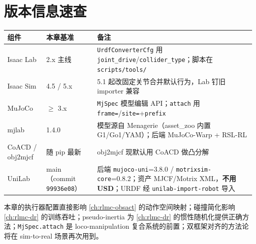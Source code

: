 \section*{版本信息速查}
\label{sec:rlmc-assets-versions}

\begin{center}
\small
\begin{tabular}{@{}lll@{}}
\toprule
组件 & 本章基准 & 备注 \\
\midrule
Isaac Lab & 2.x 主线 & \texttt{UrdfConverterCfg} 用 \texttt{joint\_drive}/\texttt{collider\_type}；脚本在 \texttt{scripts/tools/} \\
Isaac Sim & 4.5 / 5.x & 5.1 起改固定关节合并默认行为，Lab 钉旧 importer 兼容 \\
MuJoCo & $\ge$ 3.x & \texttt{MjSpec} 模型编辑 API；\texttt{attach} 用 \texttt{frame=}/\texttt{site=}+\texttt{prefix} \\
mjlab & 1.4.0 & 模型源自 Menagerie（asset\_zoo 内置 G1/Go1/YAM）；后端 MuJoCo-Warp + RSL-RL \\
CoACD / obj2mjcf & 随 pip 最新 & obj2mjcf 现默认用 CoACD 做凸分解 \\
UniLab & main（commit \texttt{99936e08}） & 后端 \texttt{mujoco-uni}=3.8.0 / \texttt{motrixsim-core}=0.8.2；资产 MJCF/Motrix XML，\textbf{不用 USD}；URDF 经 \texttt{unilab-import-robot} 导入 \\
\bottomrule
\end{tabular}
\end{center}

\begin{note}[本章与后续的连接]
本章的执行器配置直接影响 \cref{ch:rlmc-obsact} 的动作空间映射；碰撞简化影响 \cref{ch:rlmc-dr} 的训练吞吐；pseudo-inertia 为 \cref{ch:rlmc-dr} 的惯性随机化提供正确方法；\texttt{MjSpec.attach} 是 loco-manipulation 复合系统的前置；双框架对齐的方法论将在 sim-to-real 场景再次用到。
\end{note}
